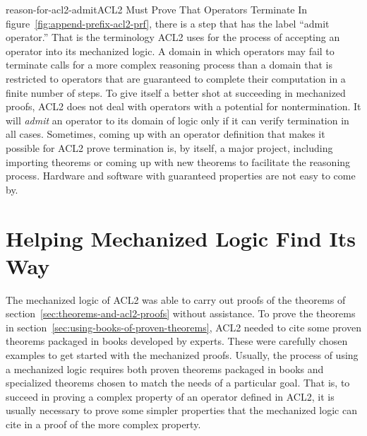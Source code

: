 \begin{aside}{reason-for-acl2-admit}{ACL2 Must Prove That Operators Terminate}
In figure~\ref{fig:append-prefix-acl2-prf},
there is a step that has the label ``admit operator.''
That is the terminology ACL2 uses for the process of accepting
an operator into its mechanized logic.
A domain in which operators may fail to terminate
calls for a more complex reasoning process than a domain that is
restricted to operators that are guaranteed to complete their
computation in a finite number of steps.
To give itself a better shot at succeeding in mechanized proofs,
ACL2 does not deal with operators with a potential for nontermination.
It will \emph{admit} an operator to its domain of logic
only if it can verify termination in all cases.
Sometimes, coming up with an operator definition that makes
it possible for ACL2 prove termination is, by itself,
a major project, including importing theorems or coming up with new
theorems to facilitate the reasoning process.
Hardware and software with guaranteed properties are not easy to come
by.
\end{aside}

\begin{exercises}




\end{exercises}

\section{Helping Mechanized Logic Find Its Way}
\label{sec:lemmas}

The mechanized logic of ACL2 was able to carry out proofs of
the theorems of section~\ref{sec:theorems-and-acl2-proofs} without assistance.
To prove the theorems in section~\ref{sec:using-books-of-proven-theorems},
ACL2 needed to cite some proven theorems packaged in books
developed by experts.
These were carefully chosen examples to get started with
the mechanized proofs.
Usually, the process of using a mechanized logic requires
both proven theorems packaged in books
and specialized theorems chosen to match the
needs of a particular goal.
That is, to succeed in proving a complex property of
an operator defined in ACL2,
it is usually necessary to prove
some simpler properties that the mechanized
logic can cite in a proof of the more complex property.

